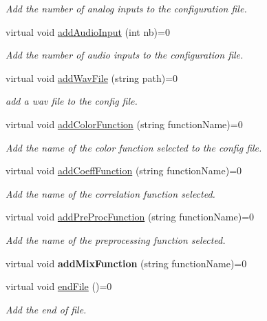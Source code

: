 \begin{DoxyCompactItemize}
\begin{DoxyCompactList}\small\item\em Add the number of analog inputs to the configuration file. \end{DoxyCompactList}\item 
virtual void \mbox{\hyperlink{class_g_u_i_file_setting_builder_adf0f3d72bbc03dd11d4914410e6bee3b}{add\+Audio\+Input}} (int nb)=0
\begin{DoxyCompactList}\small\item\em Add the number of audio inputs to the configuration file. \end{DoxyCompactList}\item 
virtual void \mbox{\hyperlink{class_g_u_i_file_setting_builder_ac18e732eac07a5d2e5146273d60e7655}{add\+Wav\+File}} (string path)=0
\begin{DoxyCompactList}\small\item\em add a wav file to the config file. \end{DoxyCompactList}\item 
virtual void \mbox{\hyperlink{class_g_u_i_file_setting_builder_a640a258d617394edf010da3feaf80e11}{add\+Color\+Function}} (string function\+Name)=0
\begin{DoxyCompactList}\small\item\em Add the name of the color function selected to the config file. \end{DoxyCompactList}\item 
virtual void \mbox{\hyperlink{class_g_u_i_file_setting_builder_a03833a30982887633f6b9d0e3d71e1f8}{add\+Coeff\+Function}} (string function\+Name)=0
\begin{DoxyCompactList}\small\item\em Add the name of the correlation function selected. \end{DoxyCompactList}\item 
virtual void \mbox{\hyperlink{class_g_u_i_file_setting_builder_ad1b6098cd9d6f18d1aaf4ab3af87d9df}{add\+Pre\+Proc\+Function}} (string function\+Name)=0
\begin{DoxyCompactList}\small\item\em Add the name of the preprocessing function selected. \end{DoxyCompactList}\item 
\mbox{\label{class_g_u_i_file_setting_builder_a741009c6cb5a945582ba24b5324aef66}} 
virtual void {\bfseries add\+Mix\+Function} (string function\+Name)=0
\item 
\mbox{\label{class_g_u_i_file_setting_builder_a991798f7939014dd275c1ea4eefceb6d}} 
virtual void \mbox{\hyperlink{class_g_u_i_file_setting_builder_a991798f7939014dd275c1ea4eefceb6d}{end\+File}} ()=0
\begin{DoxyCompactList}\small\item\em Add the end of file. \end{DoxyCompactList}\end{DoxyCompactItemize}


